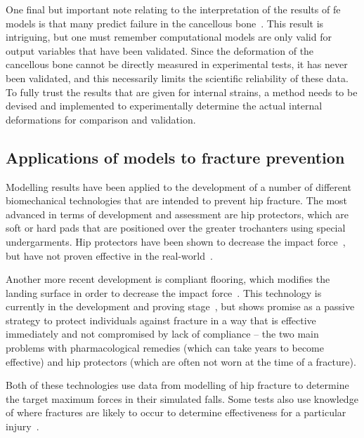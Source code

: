 One final but important note relating to the interpretation of the results of \ac{fe} models is that many predict failure in the cancellous bone~\citep{bryan_use_2009, keyak_prediction_2001, keyak_prediction_2000, keyak_prediction_1998, lotz_fracture_1991, lotz_stress_1995, nawathe_microstructural_2013, verhulp_comparison_2006, verhulp_load_2008}.
This result is intriguing, but one must remember computational models are only valid for output variables that have been validated.
Since the deformation of the cancellous bone cannot be directly measured in experimental tests, it has never been validated, and this necessarily limits the scientific reliability of these data.
To fully trust the results that are given for internal strains, a method needs to be devised and implemented to experimentally determine the actual internal deformations for comparison and validation.

\subsection{Applications of models to fracture prevention}
\label{sec:intro_understanding_application}
Modelling results have been applied to the development of a number of different biomechanical technologies that are intended to prevent hip fracture.
The most advanced in terms of development and assessment are hip protectors, which are soft or hard pads that are positioned over the greater trochanters using special undergarments.
Hip protectors have been shown to decrease the impact force~\citep{choi_effect_2010,laing_force_2008, van_schoor_biomechanical_2006}, but have not proven effective in the real-world~\citep{kiel_efficacy_2007, parker_effectiveness_2006}.

Another more recent development is compliant flooring, which modifies the landing surface in order to decrease the impact force~\citep{laing_effect_2006, li_comparison_2013}.
This technology is currently in the development and proving stage~\citep{clinicaltrials.gov_flooring_2012}, but shows promise as a passive strategy to protect individuals against fracture in a way that is effective immediately and not compromised by lack of compliance -- the two main problems with pharmacological remedies (which can take years to become effective) and hip protectors (which are often not worn at the time of a fracture).

Both of these technologies use data from modelling of hip fracture to determine the target maximum forces in their simulated falls.
Some tests also use knowledge of where fractures are likely to occur to determine effectiveness for a particular injury~\citep{laing_force_2008}.

